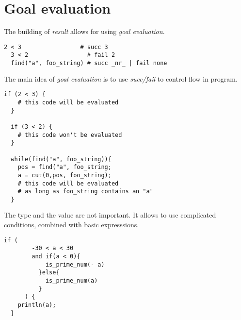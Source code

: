 \chapter{Goal evaluation}

The building of \emph{result} allows for using \emph{goal evaluation}.

\begin{example}
\begin{lstlisting}[language=intentio]
  2 < 3                 # succ 3
  3 < 2                 # fail 2
  find("a", foo_string) # succ _nr_ | fail none
\end{lstlisting}
\end{example}

The main idea of \emph{goal evaluation} is to use \emph{succ/fail} to control flow in program.

\begin{example}
\begin{lstlisting}[language=intentio,mathescape=true]
  if (2 < 3) {
    # this code will be evaluated
  }

  if (3 < 2) {
    # this code won't be evaluated
  }

  while(find("a", foo_string)){
    pos = find("a", foo_string;
    a = cut(0,pos, foo_string);
    # this code will be evaluated 
    # as long as foo_string contains an "a"
  }
\end{lstlisting}
\end{example}

\clearpage
The type and the value are not important. It allows to use complicated conditions, combined with basic expresssions.

\begin{example}
\begin{lstlisting}[language=intentio,mathescape=true]
  if (
        -30 < a < 30
        and if(a < 0){
            is_prime_num(- a)
          }else{
            is_prime_num(a)
          }
      ) {
    println(a);
  }
\end{lstlisting}
\end{example}
